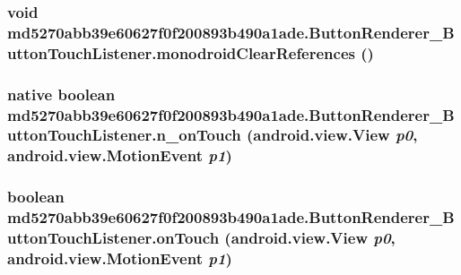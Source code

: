 \hypertarget{classmd5270abb39e60627f0f200893b490a1ade_1_1_button_renderer___button_touch_listener_bbf99eca09ba5a4f75e2cb5536fcfddc}{
\subsubsection[{monodroidClearReferences}]{\setlength{\rightskip}{0pt plus 5cm}void md5270abb39e60627f0f200893b490a1ade.ButtonRenderer\_\-ButtonTouchListener.monodroidClearReferences ()}}
\label{classmd5270abb39e60627f0f200893b490a1ade_1_1_button_renderer___button_touch_listener_bbf99eca09ba5a4f75e2cb5536fcfddc}


\hypertarget{classmd5270abb39e60627f0f200893b490a1ade_1_1_button_renderer___button_touch_listener_951a6425ee250bcf07b10cc8bd2d9ac8}{
\subsubsection[{n\_\-onTouch}]{\setlength{\rightskip}{0pt plus 5cm}native boolean md5270abb39e60627f0f200893b490a1ade.ButtonRenderer\_\-ButtonTouchListener.n\_\-onTouch (android.view.View {\em p0}, \/  android.view.MotionEvent {\em p1})}}
\label{classmd5270abb39e60627f0f200893b490a1ade_1_1_button_renderer___button_touch_listener_951a6425ee250bcf07b10cc8bd2d9ac8}


\hypertarget{classmd5270abb39e60627f0f200893b490a1ade_1_1_button_renderer___button_touch_listener_698aef31ea103a2c7ad4461c6ce0ce98}{
\subsubsection[{onTouch}]{\setlength{\rightskip}{0pt plus 5cm}boolean md5270abb39e60627f0f200893b490a1ade.ButtonRenderer\_\-ButtonTouchListener.onTouch (android.view.View {\em p0}, \/  android.view.MotionEvent {\em p1})}}
\label{classmd5270abb39e60627f0f200893b490a1ade_1_1_button_renderer___button_touch_listener_698aef31ea103a2c7ad4461c6ce0ce98}





